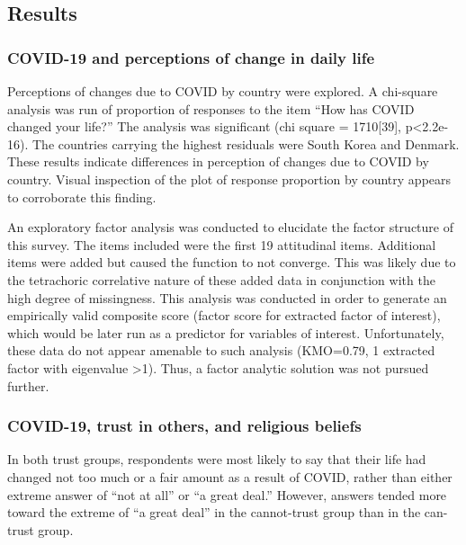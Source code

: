 \documentclass[
  english,
  man]{apa6}
\begin{document}
\hypertarget{results}{%
\subsection{Results}\label{results}}

\hypertarget{covid-19-and-perceptions-of-change-in-daily-life}{%
\subsubsection{COVID-19 and perceptions of change in daily life}\label{covid-19-and-perceptions-of-change-in-daily-life}}

Perceptions of changes due to COVID by country were explored. A chi-square analysis was run of proportion of responses to the item \enquote{How has COVID changed your life?} The analysis was significant (chi square = 1710{[}39{]}, p\textless2.2e-16). The countries carrying the highest residuals were South Korea and Denmark. These results indicate differences in perception of changes due to COVID by country. Visual inspection of the plot of response proportion by country appears to corroborate this finding.

An exploratory factor analysis was conducted to elucidate the factor structure of this survey. The items included were the first 19 attitudinal items. Additional items were added but caused the function to not converge. This was likely due to the tetrachoric correlative nature of these added data in conjunction with the high degree of missingness. This analysis was conducted in order to generate an empirically valid composite score (factor score for extracted factor of interest), which would be later run as a predictor for variables of interest. Unfortunately, these data do not appear amenable to such analysis (KMO=0.79, 1 extracted factor with eigenvalue \textgreater1). Thus, a factor analytic solution was not pursued further.

\hypertarget{covid-19-trust-in-others-and-religious-beliefs}{%
\subsubsection{COVID-19, trust in others, and religious beliefs}\label{covid-19-trust-in-others-and-religious-beliefs}}

In both trust groups, respondents were most likely to say that their life had changed not too much or a fair amount as a result of COVID, rather than either extreme answer of \enquote{not at all} or \enquote{a great deal.} However, answers tended more toward the extreme of \enquote{a great deal} in the cannot-trust group than in the can-trust group.
\end{document}
